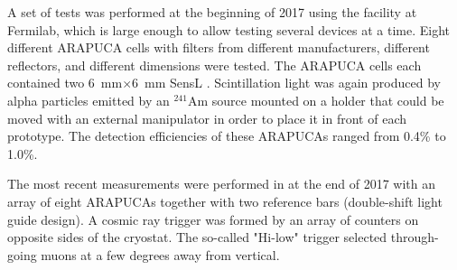 
A set of tests was performed at the beginning of 2017 using the  facility at Fermilab, which is large enough to allow testing several devices at a time. Eight different ARAPUCA cells with filters from different manufacturers, different reflectors, and different dimensions were tested.  
The ARAPUCA cells each contained two \SI{6}{mm}$\times$\SI{6}{mm} SensL . 
Scintillation light was again produced by alpha particles emitted by an $^{241}$Am  source mounted on a holder that could be moved with an external manipulator in order to place it in front of each prototype. The detection efficiencies of these ARAPUCAs ranged from 0.4\% to 1.0\%.

The most recent measurements were performed in  at the end of 2017 with an array of eight ARAPUCAs together with two reference bars (double-shift light guide design). A cosmic ray trigger was formed by an array of counters on opposite sides of the cryostat. The so-called "Hi-low" trigger selected through-going muons at a few degrees away from vertical.

